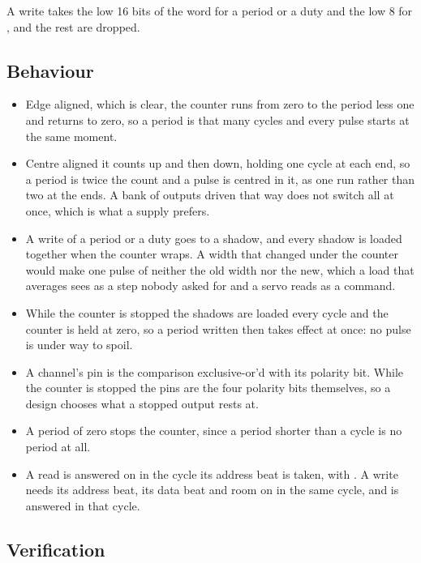 A write takes the low 16 bits of the word for a period or a duty and
the low 8 for , and the rest are dropped.


\subsection*{Behaviour}

\begin{itemize}
\item Edge aligned, which is  clear, the counter
runs from zero to the period less one and returns to zero, so a period
is that many cycles and every pulse starts at the same moment.
\item Centre aligned it counts up and then down, holding one cycle at
each end, so a period is twice the count and a pulse is centred in it,
as one run rather than two at the ends. A bank of outputs driven that
way does not switch all at once, which is what a supply prefers.
\item A write of a period or a duty goes to a shadow, and every shadow
is loaded together when the counter wraps. A width that changed under
the counter would make one pulse of neither the old width nor the new,
which a load that averages sees as a step nobody asked for and a servo
reads as a command.
\item While the counter is stopped the shadows are loaded every cycle
and the counter is held at zero, so a period written then takes effect
at once: no pulse is under way to spoil.
\item A channel's pin is the comparison exclusive-or'd with its
polarity bit. While the counter is stopped the pins are the four
polarity bits themselves, so a design chooses what a stopped output
rests at.
\item A period of zero stops the counter, since a period shorter than a
cycle is no period at all.
\item A read is answered on  in the cycle its address beat is
taken, with . A write needs its address beat, its data beat
and room on  in the same cycle, and is answered  in
that cycle.
\end{itemize}

\subsection*{Verification}

